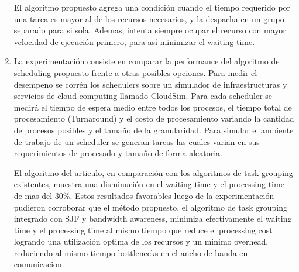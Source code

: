 \begin{enumerate}[label=\alph*)]
        El algoritmo propuesto agrega una condición cuando el tiempo requerido
        por una tarea es mayor al de los recursos necesarios, y la despacha
        en un grupo separado para si sola. Ademas, intenta siempre ocupar
        el recurso con mayor velocidad de ejecución primero, para así minimizar
        el waiting time.

    \item La experimentación consiste en comparar la performance del algoritmo de scheduling propuesto frente a otras posibles opciones. Para medir el desempeno se corrén los schedulers sobre un simulador de infraestructuras y servicios de cloud computing llamado CloudSim. Para cada scheduler se medirá el tiempo de espera medio entre todos los procesos, el tiempo total de procesamiento (Turnaround) y el costo de procesamiento variando la cantidad de procesos posibles y el tamaño de la granularidad. Para simular el ambiente de trabajo de un scheduler se generan tareas las cuales varian en sus requerimientos de procesado y tamaño de forma aleatoria.

El algoritmo del articulo, en comparación con los algoritmos de task grouping existentes, muestra una disminución en el waiting time y el processing time de mas del 30\%. Estos resultados favorables luego de la experimentación pudieron corroborar que el método propuesto, el algoritmo de task grouping integrado con SJF y bandwidth awareness, minimiza efectivamente el waiting time y el processing time al mismo tiempo que reduce el processing cost logrando una utilización optima de los recursos y un minimo overhead, reduciendo al mismo tiempo bottlenecks en el ancho de banda en comunicacion.

\end{enumerate}

